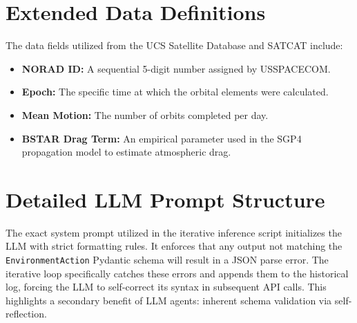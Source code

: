 \documentclass[10pt,journal,compsoc]{IEEEtran}
\begin{document}
\section{Extended Data Definitions}
The data fields utilized from the UCS Satellite Database and SATCAT include:
\begin{itemize}
    \item \textbf{NORAD ID:} A sequential 5-digit number assigned by USSPACECOM.
    \item \textbf{Epoch:} The specific time at which the orbital elements were calculated.
    \item \textbf{Mean Motion:} The number of orbits completed per day.
    \item \textbf{BSTAR Drag Term:} An empirical parameter used in the SGP4 propagation model to estimate atmospheric drag.
\end{itemize}

\section{Detailed LLM Prompt Structure}
The exact system prompt utilized in the iterative inference script initializes the LLM with strict formatting rules. It enforces that any output not matching the \texttt{EnvironmentAction} Pydantic schema will result in a JSON parse error. The iterative loop specifically catches these errors and appends them to the historical log, forcing the LLM to self-correct its syntax in subsequent API calls. This highlights a secondary benefit of LLM agents: inherent schema validation via self-reflection.
\end{document}
